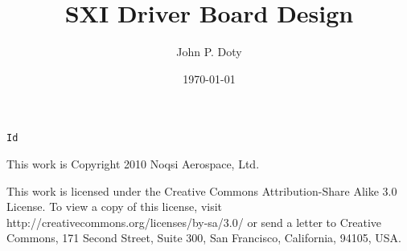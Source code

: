 \usepackage{ucs}
\usepackage[utf8x]{inputenc}
\usepackage[english]{babel}
\usepackage{fontenc}
\usepackage{graphicx}
\usepackage{grffile}
\usepackage[hmargin=2cm,vmargin=2.5cm]{geometry}
\usepackage{tikz-timing}

\setlength{\parindent}{0.0in}
\setlength{\parskip}{0.1in}

\newcommand{\tsvtable}[1]{
\begin{table}[h]
\centering
\texttt{[image: \#1.tsv.pdf]}
\caption{#1}
\label{#1}
\end{table}
}

\usepackage{placeins}
\let\oldsection\section
\renewcommand{\section}{\FloatBarrier\oldsection} 

\pagestyle{headings}

\usepackage[pdftex]{hyperref}

\author{John P. Doty}
\date{\today}
\title{SXI Driver Board Design}


\begin{titlepage}
\maketitle
\begin{center}
\verb$Id$
\end{center}
\vspace{5cm}

This work is Copyright 2010 Noqsi Aerospace, Ltd.

This work is licensed under the Creative Commons Attribution-Share Alike 3.0 License. To view a copy of this license, visit http://creativecommons.org/licenses/by-sa/3.0/ or send a letter to Creative Commons, 171 Second Street, Suite 300, San Francisco, California, 94105, USA.

\end{titlepage} 

